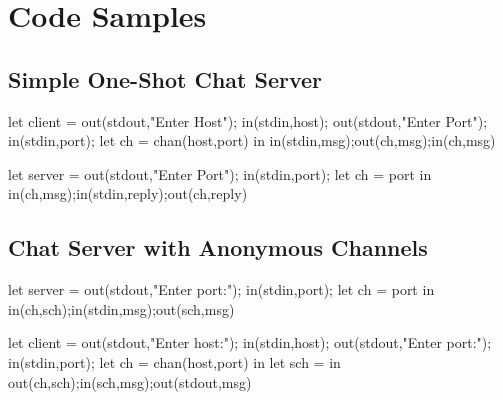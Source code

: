 \section{Code Samples}

\subsection{Simple One-Shot Chat Server}

\begin{code}
let client = 
    out(stdout,"Enter Host"); in(stdin,host);
    out(stdout,"Enter Port"); in(stdin,port);
        let ch = chan(host,port) in
            in(stdin,msg);out(ch,msg);in(ch,msg)
\end{code}

\begin{code}
let server = 
out(stdout,"Enter Port");
in(stdin,port);
    let ch = {port} in
        in(ch,msg);in(stdin,reply);out(ch,reply)
\end{code}

\subsection{Chat Server with Anonymous Channels}
\label{sec:clientserverfancy}

\begin{code}
let server = 
    out(stdout,"Enter port:"); in(stdin,port);
    let ch = {port} in 
        in(ch,sch);in(stdin,msg);out(sch,msg)
\end{code}
\begin{code}
let client = 
    out(stdout,"Enter host:"); in(stdin,host);
    out(stdout,"Enter port:"); in(stdin,port);
    let ch = chan(host,port) in
        let sch = {} in
            out(ch,sch);in(sch,msg);out(stdout,msg)
\end{code}


